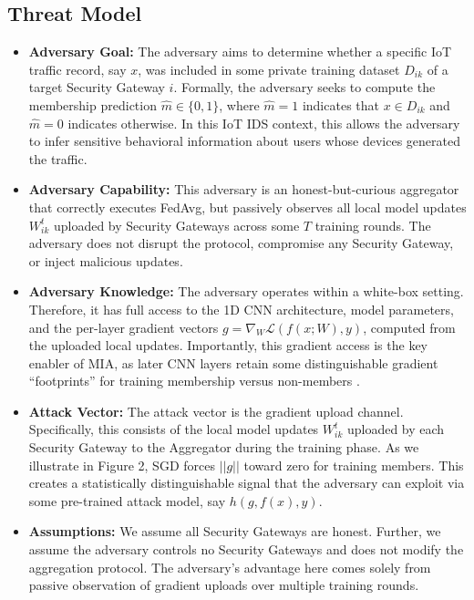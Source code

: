 \documentclass[letterpaper]{article}
\begin{document}
\subsection*{Threat Model}
\begin{itemize}
    \item \textbf{Adversary Goal:} The adversary aims to determine whether a specific IoT traffic record, say $x$, was included in some private training dataset $D_{ik}$ of a target Security Gateway $i$. Formally, the adversary seeks to compute the membership prediction $\hat{m} \in \{0,1\}$, where $\hat{m}=1$ indicates that $x \in D_{ik}$ and $\hat{m}=0$ indicates otherwise. In this IoT IDS context, this allows the adversary to infer sensitive behavioral information about users whose devices generated the traffic.

    \item \textbf{Adversary Capability:} This adversary is an honest-but-curious aggregator that correctly executes FedAvg, but passively observes all local model updates $W_{ik}^t$ uploaded by Security Gateways across some $T$ training rounds. The adversary does not disrupt the protocol, compromise any Security Gateway, or inject malicious updates.

    \item \textbf{Adversary Knowledge:} The adversary operates within a white-box setting. Therefore, it has full access to the 1D CNN architecture, model parameters, and the per-layer gradient vectors $g=\nabla_{W}\mathcal{L}(f(x;W),y)$, computed from the uploaded local updates. Importantly, this gradient access is the key enabler of MIA, as later CNN layers retain some distinguishable gradient ``footprints'' for training membership versus non-members \cite{nasr2019}.

    \item \textbf{Attack Vector:} The attack vector is the gradient upload channel. Specifically, this consists of the local model updates $W_{ik}^t$ uploaded by each Security Gateway to the Aggregator during the training phase. As we illustrate in Figure 2, SGD forces $||g||$ toward zero for training members. This creates a statistically distinguishable signal that the adversary can exploit via some pre-trained attack model, say $h(g, f(x), y)$.

    \item \textbf{Assumptions:} We assume all Security Gateways are honest. Further, we assume the adversary controls no Security Gateways and does not modify the aggregation protocol. The adversary's advantage here comes solely from passive observation of gradient uploads over multiple training rounds.
\end{itemize}

\newpage
\printbibliography[title={References}]
\end{document}
